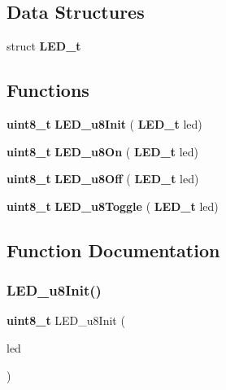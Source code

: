 \subsection*{Data Structures}
\begin{DoxyCompactItemize}
\item 
struct \textbf{ L\+E\+D\+\_\+t}
\end{DoxyCompactItemize}
\subsection*{Functions}
\begin{DoxyCompactItemize}
\item 
\textbf{ uint8\+\_\+t} \textbf{ L\+E\+D\+\_\+u8\+Init} (\textbf{ L\+E\+D\+\_\+t} led)
\item 
\textbf{ uint8\+\_\+t} \textbf{ L\+E\+D\+\_\+u8\+On} (\textbf{ L\+E\+D\+\_\+t} led)
\item 
\textbf{ uint8\+\_\+t} \textbf{ L\+E\+D\+\_\+u8\+Off} (\textbf{ L\+E\+D\+\_\+t} led)
\item 
\textbf{ uint8\+\_\+t} \textbf{ L\+E\+D\+\_\+u8\+Toggle} (\textbf{ L\+E\+D\+\_\+t} led)
\end{DoxyCompactItemize}


\subsection{Function Documentation}
\mbox{\label{_l_e_d_8h_a5ffbd3f57e696c662ae3ae52b119e867}} 
\subsubsection{L\+E\+D\+\_\+u8\+Init()}
{\footnotesize\ttfamily \textbf{ uint8\+\_\+t} L\+E\+D\+\_\+u8\+Init (\begin{DoxyParamCaption}\item[{\textbf{ L\+E\+D\+\_\+t}}]{led }\end{DoxyParamCaption})}

